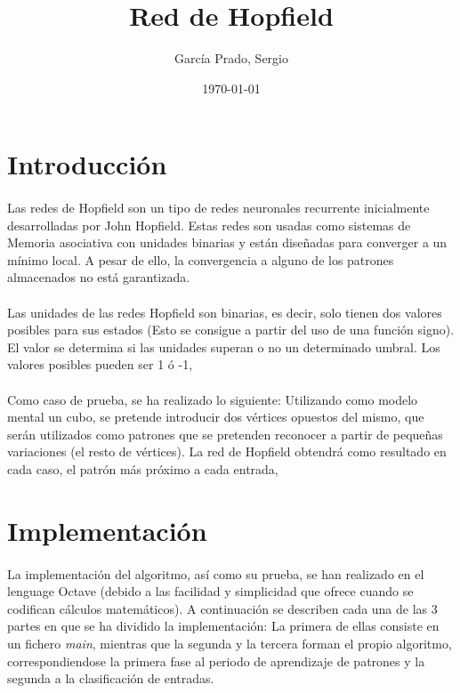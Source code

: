 \documentclass[10pt, a4paper,spanish]{article}
\title{\vspace{-15mm}\fontsize{24pt}{10pt}\selectfont\textbf{Red de Hopfield}}
\author{García Prado, Sergio}
\date{\today}
\begin{document}
	\maketitle

	\thispagestyle{fancy}




  \section{Introducción}

    \paragraph{}
		Las redes de Hopfield son un tipo de redes neuronales recurrente inicialmente desarrolladas por John Hopfield. Estas redes son usadas como sistemas de Memoria asociativa con unidades binarias y están diseñadas para converger a un mínimo local. A pesar de ello, la convergencia a alguno de los patrones almacenados no está garantizada.

		\paragraph{}
		Las unidades de las redes Hopfield son binarias, es decir, solo tienen dos valores posibles para sus estados (Esto se consigue a partir del uso de una función signo). El valor se determina si las unidades superan o no un determinado umbral. Los valores posibles pueden ser 1 ó -1,

		\paragraph{}
		Como caso de prueba, se ha realizado lo siguiente: Utilizando como modelo mental un cubo, se pretende introducir dos vértices opuestos del mismo, que serán utilizados como patrones que se pretenden reconocer a partir de pequeñas variaciones (el resto de vértices). La red de Hopfield obtendrá como resultado en cada caso, el patrón más próximo a cada entrada,


	\section{Implementación}

		\paragraph{}
		La implementación del algoritmo, así como su prueba, se han realizado en el lenguage Octave (debido a las facilidad y simplicidad que ofrece cuando se codifican cálculos matemáticos). A continuación se describen cada una de las 3 partes en que se ha dividido la implementación: La primera de ellas consiste en un fichero \emph{main}, mientras que la segunda y la tercera forman el propio algoritmo, correspondiendose la primera fase al periodo de aprendizaje de patrones y la segunda a la clasificación de entradas.
\end{document}
